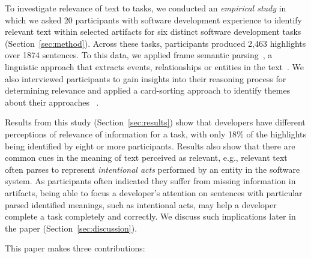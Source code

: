 To investigate relevance of text to tasks, we conducted an
\textit{empirical study} in which we asked 20 participants with
software development experience to identify relevant text within
selected artifacts for six distinct software development tasks
(Section~\ref{sec:method}).
Across these tasks,
participants produced 2,463 highlights over 1874 sentences.
To this data, we applied
frame semantic parsing~\cite{das2014frame}, a linguistic approach that extracts events, relationships or entities in the text~\cite{Baker1998}.
We also interviewed participants to gain insights into their
reasoning process for determining relevance and
applied a card-sorting approach to identify themes about their approaches~\cite{spencer2009sorting} .



Results from this study (Section~\ref{sec:results}) show that
developers have different perceptions of relevance of information for
a task, with only 18\% of the highlights being identified
by eight or more participants. Results also show that
there are common cues in the meaning of text perceived
as relevant, e.g., relevant text often parses to represent
\textit{intentional acts} performed by an entity in the software
system. As participants often indicated they suffer from
missing information in artifacts, being able to
focus a developer's attention on sentences with particular
parsed identified meanings, such as intentional acts,
 may help a developer complete a task completely
and correctly.  We discuss such implications later
in the paper (Section~\ref{sec:discussion}).

This paper makes three contributions:



